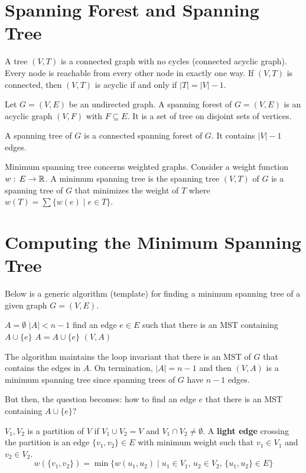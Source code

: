 \section{Spanning Forest and Spanning Tree}

A tree $(V,T)$ is a connected graph with no cycles (connected acyclic graph). Every node is reachable from every other node in exactly one way. If $(V,T)$ is connected, then $(V,T)$ is acyclic if and only if $|T| = |V|-1$.

\begin{definition}  
    Let $G = (V,E)$ be an undirected graph. A spanning forest of $G = (V,E)$ is an acyclic graph $(V,F)$ with $F \subseteq E$. It is a set of tree on disjoint sets of vertices.

    A spanning tree of $G$ is a connected spanning forest of $G$. It contains $|V| - 1$ edges.
\end{definition}

Minimum spanning tree concerns weighted graphs. Consider a weight function $w:\, E \to \mathbb{R}$. A minimum spanning tree is the spanning tree $(V,T)$ of $G$ is a spanning tree of $G$ that minimizes the weight of $T$ where $w(T) = \sum \{ w(e) \mid e \in T \}$.

\section{Computing the Minimum Spanning Tree}

Below is a generic algorithm (template) for finding a minimum spanning tree of a given graph $G=(V,E)$.

\begin{codebox}
    \li $A = \emptyset$
    \li \While $|A| < n-1$ \Do
        \li find an edge $e \in E$ such that there is an MST containing $A \cup \{e\}$ 
        \li $A = A \cup \{e\}$ 
    \li \Return $(V,A)$  
\end{codebox}

The algorithm maintains the loop invariant that there is an MST of $G$ that contains the edges in $A$. On termination, $|A|=n-1$ and then $(V,A)$ is a minimum spanning tree since spanning trees of $G$ have $n-1$ edges.

But then, the question becomes: how to find an edge $e$ that there is an MST containing $A \cup \{e\}$?

$V_1,V_2$ is a partition of $V$ if $V_1 \cup V_2 = V$ and $V_1 \cap V_2 \neq \emptyset$. A \textbf{light edge} crossing the partition is an edge $\{v_1,v_2\} \in E$ with minimum weight such that $v_1 \in V_1$ and $v_2 \in V_2$.
$$
w(\{v_1,v_2\}) = \min \{ w(u_1,u_2) \mid u_1 \in V_1,\, u_2 \in V_2,\, \{ u_1, u_2 \} \in E \}
$$

